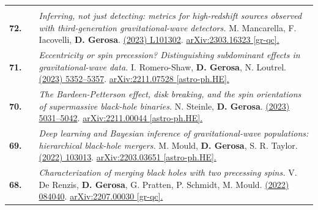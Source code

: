 {\begin{longtable}{rp{0.3cm}p{15.8cm}}
\vspace{0.09cm}\\
%
\textbf{72.} & & \textit{Inferring, not just detecting: metrics for high-redshift sources observed with third-generation gravitational-wave detectors.}
\newline{}
M. Mancarella, F. Iacovelli, \textbf{D. Gerosa}.
\newline{}
\href{https://journals.aps.org/prd/abstract/10.1103/PhysRevD.107.L101302}{\prdl 107 (2023) L101302}. \href{https://arxiv.org/abs/2303.16323}{arXiv:2303.16323 [gr-qc].}
\vspace{0.09cm}\\
%
\textbf{71.} & & \textit{Eccentricity or spin precession? Distinguishing subdominant effects in gravitational-wave data.}
\newline{}
I. Romero-Shaw, \textbf{D. Gerosa}, N. Loutrel.
\newline{}
\href{https://doi.org/10.1093/mnras/stad031}{\mnras 519 (2023) 5352–5357}. \href{https://arxiv.org/abs/2211.07528}{arXiv:2211.07528 [astro-ph.HE].}
\vspace{0.09cm}\\
%
\textbf{70.} & & \textit{The Bardeen-Petterson effect, disk breaking, and the spin orientations of supermassive black-hole binaries.}
\newline{}
N. Steinle, \textbf{D. Gerosa}.
\newline{}
\href{https://doi.org/10.1093/mnras/stac3821}{\mnras 519 (2023) 5031–5042}. \href{https://arxiv.org/abs/2211.00044}{arXiv:2211.00044 [astro-ph.HE].}
\vspace{0.09cm}\\
%
\textbf{69.} & & \textit{Deep learning and Bayesian inference of gravitational-wave populations: hierarchical black-hole mergers.}
\newline{}
M. Mould, \textbf{D. Gerosa}, S. R. Taylor.
\newline{}
\href{https://journals.aps.org/prd/abstract/10.1103/PhysRevD.106.103013}{\prd 106 (2022) 103013}. \href{https://arxiv.org/abs/2203.03651}{arXiv:2203.03651 [astro-ph.HE].}
\vspace{0.09cm}\\
%
\textbf{68.} & & \textit{Characterization of merging black holes with two precessing spins.}
\newline{}
V. De Renzis, \textbf{D. Gerosa}, G. Pratten, P. Schmidt, M. Mould.
\newline{}
\href{https://journals.aps.org/prd/abstract/10.1103/PhysRevD.106.084040}{\prd 106 (2022) 084040}. \href{https://arxiv.org/abs/2207.00030}{arXiv:2207.00030 [gr-qc].}

\end{longtable}}
